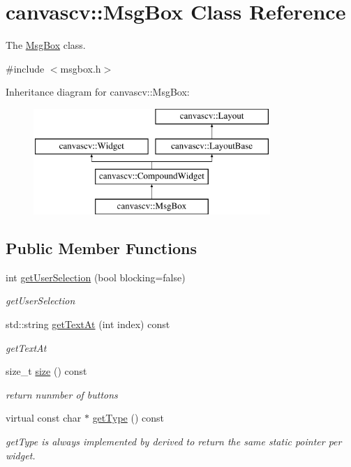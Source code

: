 \hypertarget{classcanvascv_1_1MsgBox}{}\section{canvascv\+:\+:Msg\+Box Class Reference}
\label{classcanvascv_1_1MsgBox}


The \hyperlink{classcanvascv_1_1MsgBox}{Msg\+Box} class.  




{\ttfamily \#include $<$msgbox.\+h$>$}

Inheritance diagram for canvascv\+:\+:Msg\+Box\+:\begin{figure}[H]
\begin{center}
\leavevmode
\includegraphics[height=4.000000cm]{classcanvascv_1_1MsgBox}
\end{center}
\end{figure}
\subsection*{Public Member Functions}
\begin{DoxyCompactItemize}
\item 
int \hyperlink{classcanvascv_1_1MsgBox_a8762fe664f293389a1b823c75dc545e1}{get\+User\+Selection} (bool blocking=false)
\begin{DoxyCompactList}\small\item\em get\+User\+Selection \end{DoxyCompactList}\item 
std\+::string \hyperlink{classcanvascv_1_1MsgBox_af97285a26857652a316387505ff7dce0}{get\+Text\+At} (int index) const 
\begin{DoxyCompactList}\small\item\em get\+Text\+At \end{DoxyCompactList}\item 
size\+\_\+t \hyperlink{classcanvascv_1_1MsgBox_adc1e629426ea62ff9b1391c18fcb3a4a}{size} () const \hypertarget{classcanvascv_1_1MsgBox_adc1e629426ea62ff9b1391c18fcb3a4a}{}\label{classcanvascv_1_1MsgBox_adc1e629426ea62ff9b1391c18fcb3a4a}

\begin{DoxyCompactList}\small\item\em return nunmber of buttons \end{DoxyCompactList}\item 
virtual const char $\ast$ \hyperlink{classcanvascv_1_1MsgBox_ad846e38adb000c10fac57e433d894001}{get\+Type} () const 
\begin{DoxyCompactList}\small\item\em get\+Type is always implemented by derived to return the same static pointer per widget. \end{DoxyCompactList}\end{DoxyCompactItemize}
